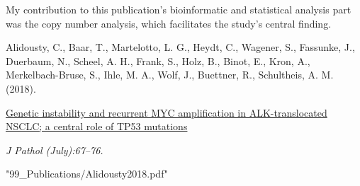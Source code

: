 \enlargethispage{\baselineskip}

\vfill
\noindent My contribution to this publication's bioinformatic and statistical
analysis part was the copy number analysis, which facilitates the study's
central finding.\nopagebreak
\medskip
\begin{tcolorbox}[
  boxrule=0pt, leftrule=1pt, colframe=s-blue, colback=white, sharp corners=all]%
  \raggedright
  Alidousty, C., Baar, T., Martelotto, L. G., Heydt, C., Wagener, S.,
  Fassunke, J., Duerbaum, N., Scheel, A. H., Frank, S., Holz, B., Binot, E.,
  Kron, A., Merkelbach-Bruse, S., Ihle, M. A., Wolf, J., Buettner, R.,
  Schultheis, A. M. (2018).
  
  \smallskip
  \href{http://doi.wiley.com/10.1002/path.5110}
    {Genetic instability and recurrent MYC amplification in ALK-translocated
    NSCLC; a central role of TP53 mutations}

  \smallskip
  \textit{J Pathol (July):67–76.}
\end{tcolorbox}



  {"99_Publications/Alidousty2018.pdf"}

